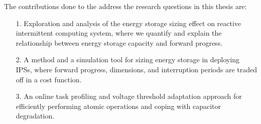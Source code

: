 
The contributions done to the address the research questions in this thesis are:
\begin{itemize}
  \item[1.] Exploration and analysis of the energy storage sizing effect on reactive intermittent computing system, where we quantify and explain the relationship between energy storage capacity and forward progress.
  \item[2.] A method and a simulation tool for sizing energy storage in deploying IPSs, where forward progress, dimensions, and interruption periods are traded off in a cost function.
  \item[3.] An online task profiling and voltage threshold adaptation approach for efficiently performing atomic operations and coping with capacitor degradation. 
\end{itemize}


